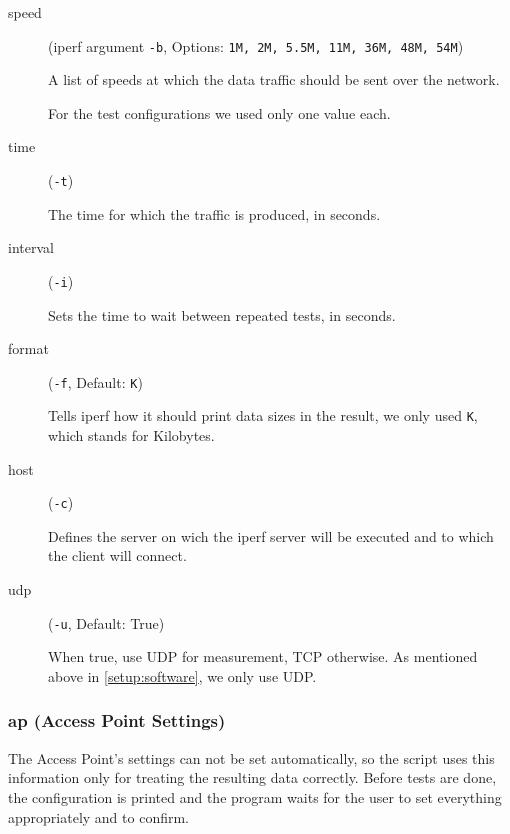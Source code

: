 \begin{description}
	\item[speed] (iperf argument \verb|-b|, Options: {\tt 1M, 2M, 5.5M, 11M, 36M, 48M, 54M})

		A list of speeds at which the data traffic should be sent over the network.	

		For the test configurations we used only one value each.

	\item[time] (\verb|-t|)

		The time for which the traffic is produced, in seconds.

	\item[interval] (\verb|-i|)

		Sets the time to wait between repeated tests, in seconds.

	\item[format] (\verb|-f|, Default: \verb|K|)

		Tells iperf how it should print data sizes in the result, we only used {\tt K}, which stands for Kilobytes.

	\item[host] (\verb|-c|)

		Defines the server on wich the iperf server will be executed and to which the client will connect.

	\item[udp] (\verb|-u|, Default: True)

		When true, use UDP for measurement, TCP otherwise.
		As mentioned above in \ref{setup:software}, we only use UDP.
\end{description}
%

\subsubsection{ap (Access Point Settings)}

\noindent
The Access Point's settings can not be set automatically, so the script uses this information only for treating the resulting data correctly. Before tests are done, the configuration is printed and the program waits for the user to set everything appropriately and to confirm.

